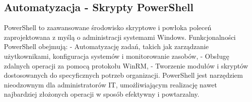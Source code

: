 \subsection{Automatyzacja - Skrypty PowerShell}
PowerShell to zaawansowane środowisko skryptowe i powłoka poleceń zaprojektowana z myślą o administracji systemami Windows. Funkcjonalności PowerShell obejmują:
- Automatyzację zadań, takich jak zarządzanie użytkownikami, konfiguracja systemów i monitorowanie zasobów,
- Obsługę zdalnych operacji za pomocą protokołu WinRM,
- Tworzenie modułów i skryptów dostosowanych do specyficznych potrzeb organizacji.
PowerShell jest narzędziem nieodzownym dla administratorów IT, umożliwiającym realizację nawet najbardziej złożonych operacji w sposób efektywny i powtarzalny.
